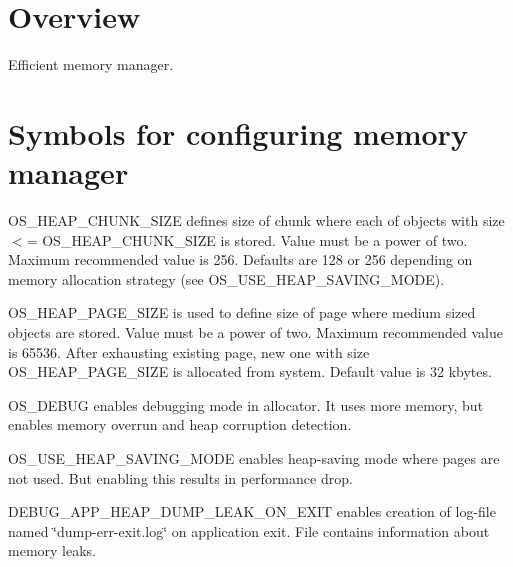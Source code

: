 \hypertarget{memorymanager_Overview}{}\section{Overview}\label{memorymanager_Overview}
Efficient memory manager.\hypertarget{memorymanager_tuning}{}\section{Symbols for configuring memory manager}\label{memorymanager_tuning}
\begin{DoxyItemize}
\item {\ttfamily O\+S\+\_\+\+H\+E\+A\+P\+\_\+\+C\+H\+U\+N\+K\+\_\+\+S\+I\+ZE} defines size of chunk where each of objects with size $<$= O\+S\+\_\+\+H\+E\+A\+P\+\_\+\+C\+H\+U\+N\+K\+\_\+\+S\+I\+ZE is stored. Value must be a power of two. Maximum recommended value is 256. Defaults are 128 or 256 depending on memory allocation strategy (see O\+S\+\_\+\+U\+S\+E\+\_\+\+H\+E\+A\+P\+\_\+\+S\+A\+V\+I\+N\+G\+\_\+\+M\+O\+DE).\end{DoxyItemize}
\begin{DoxyItemize}
\item {\ttfamily O\+S\+\_\+\+H\+E\+A\+P\+\_\+\+P\+A\+G\+E\+\_\+\+S\+I\+ZE} is used to define size of page where medium sized objects are stored. Value must be a power of two. Maximum recommended value is 65536. After exhausting existing page, new one with size O\+S\+\_\+\+H\+E\+A\+P\+\_\+\+P\+A\+G\+E\+\_\+\+S\+I\+ZE is allocated from system. Default value is 32 kbytes.\end{DoxyItemize}
\begin{DoxyItemize}
\item {\ttfamily O\+S\+\_\+\+D\+E\+B\+UG} enables debugging mode in allocator. It uses more memory, but enables memory overrun and heap corruption detection.\end{DoxyItemize}
\begin{DoxyItemize}
\item {\ttfamily O\+S\+\_\+\+U\+S\+E\+\_\+\+H\+E\+A\+P\+\_\+\+S\+A\+V\+I\+N\+G\+\_\+\+M\+O\+DE} enables heap-\/saving mode where pages are not used. But enabling this results in performance drop.\end{DoxyItemize}
\begin{DoxyItemize}
\item {\ttfamily D\+E\+B\+U\+G\+\_\+\+A\+P\+P\+\_\+\+H\+E\+A\+P\+\_\+\+D\+U\+M\+P\+\_\+\+L\+E\+A\+K\+\_\+\+O\+N\+\_\+\+E\+X\+IT} enables creation of log-\/file named \char`\"{}dump-\/err-\/exit.\+log\char`\"{} on application exit. File contains information about memory leaks. \end{DoxyItemize}
